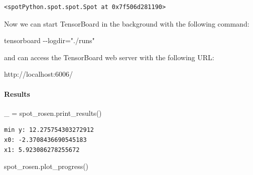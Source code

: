 \documentclass[
  letterpaper,
  DIV=11,
  numbers=noendperiod]{scrreprt}
\let\oldparagraph\paragraph
\renewcommand{\paragraph}[1]{\oldparagraph{#1}\mbox{}}
\newenvironment{Shaded}{\begin{snugshade}}{\end{snugshade}}
\newcommand{\NormalTok}[1]{\textcolor[rgb]{0.00,0.23,0.31}{#1}}
\newcommand{\OperatorTok}[1]{\textcolor[rgb]{0.37,0.37,0.37}{#1}}
\begin{document}
\begin{verbatim}
<spotPython.spot.spot.Spot at 0x7f506d281190>
\end{verbatim}

\begin{tcolorbox}[enhanced jigsaw, coltitle=black, bottomrule=.15mm, breakable, toprule=.15mm, colframe=quarto-callout-note-color-frame, title=\textcolor{quarto-callout-note-color}{\faInfo}\hspace{0.5em}{Note}, colbacktitle=quarto-callout-note-color!10!white, opacityback=0, left=2mm, leftrule=.75mm, colback=white, rightrule=.15mm, bottomtitle=1mm, toptitle=1mm, titlerule=0mm, arc=.35mm, opacitybacktitle=0.6]

Now we can start TensorBoard in the background with the following
command:

\begin{Shaded}
\begin{Highlighting}[]
\NormalTok{tensorboard {-}{-}logdir="./runs"}
\end{Highlighting}
\end{Shaded}

and can access the TensorBoard web server with the following URL:

\begin{Shaded}
\begin{Highlighting}[]
\NormalTok{http://localhost:6006/}
\end{Highlighting}
\end{Shaded}

\end{tcolorbox}

\paragraph{Results}\label{results-3}

\begin{Shaded}
\begin{Highlighting}[]
\NormalTok{\_ }\OperatorTok{=}\NormalTok{ spot\_rosen.print\_results()}
\end{Highlighting}
\end{Shaded}

\begin{verbatim}
min y: 12.275754303272912
x0: -2.3708436690545183
x1: 5.923086278255672
\end{verbatim}

\begin{Shaded}
\begin{Highlighting}[]
\NormalTok{spot\_rosen.plot\_progress()}
\end{Highlighting}
\end{Shaded}
\end{document}
